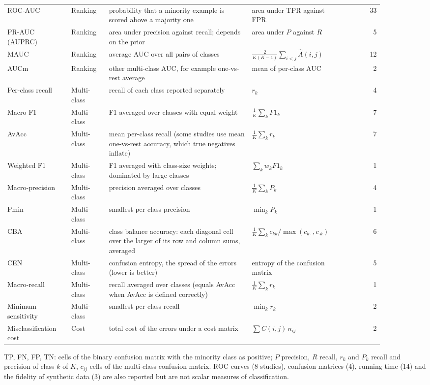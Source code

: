 \begin{table}[p]
\begin{tabular}{@{}>{\raggedright\arraybackslash}p{0.17\linewidth}>{\raggedright\arraybackslash}p{0.1\linewidth}>{\raggedright\arraybackslash}p{0.38\linewidth}>{\raggedright\arraybackslash}p{0.24\linewidth}r@{}}
    \midrule
    ROC-AUC & Ranking & probability that a minority example is scored above a majority one & area under TPR against FPR & 33\\
    PR-AUC (AUPRC) & Ranking & area under precision against recall; depends on the prior & area under $P$ against $R$ & 5\\
    MAUC & Ranking & average AUC over all pairs of classes~\parencite{hand2001simple} & $\frac{2}{K(K-1)}\sum_{i<j}\hat{A}(i,j)$ & 12\\
    AUCm & Ranking & other multi-class AUC, for example one-vs-rest average & mean of per-class AUC & 2\\
    \midrule
    Per-class recall & Multi-class & recall of each class reported separately & $r_k$ & 4\\
    Macro-F1 & Multi-class & F1 averaged over classes with equal weight & $\frac{1}{K}\sum_k F1_k$ & 7\\
    AvAcc & Multi-class & mean per-class recall (some studies use mean one-vs-rest accuracy, which true negatives inflate) & $\frac{1}{K}\sum_k r_k$ & 7\\
    Weighted F1 & Multi-class & F1 averaged with class-size weights; dominated by large classes & $\sum_k w_k F1_k$ & 1\\
    Macro-precision & Multi-class & precision averaged over classes & $\frac{1}{K}\sum_k P_k$ & 4\\
    Pmin & Multi-class & smallest per-class precision & $\min_k P_k$ & 1\\
    CBA & Multi-class & class balance accuracy: each diagonal cell over the larger of its row and column sums, averaged & $\frac{1}{K}\sum_k c_{kk}/\max(c_{k\cdot}, c_{\cdot k})$ & 6\\
    CEN & Multi-class & confusion entropy, the spread of the errors (lower is better) & entropy of the confusion matrix & 5\\
    Macro-recall & Multi-class & recall averaged over classes (equals AvAcc when AvAcc is defined correctly) & $\frac{1}{K}\sum_k r_k$ & 1\\
    Minimum sensitivity & Multi-class & smallest per-class recall & $\min_k r_k$ & 2\\
    \midrule
    Misclassification cost & Cost & total cost of the errors under a cost matrix & $\sum C(i,j)\,n_{ij}$ & 2\\
    \bottomrule
  \end{tabular}
  \par\smallskip\raggedright\scriptsize TP, FN, FP, TN: cells of the binary confusion matrix with the minority class as positive; $P$ precision, $R$ recall, $r_k$ and $P_k$ recall and precision of class $k$ of $K$, $c_{ij}$ cells of the multi-class confusion matrix. ROC curves (8 studies), confusion matrices (4), running time (14) and the fidelity of synthetic data (3) are also reported but are not scalar measures of classification.
\end{table}
